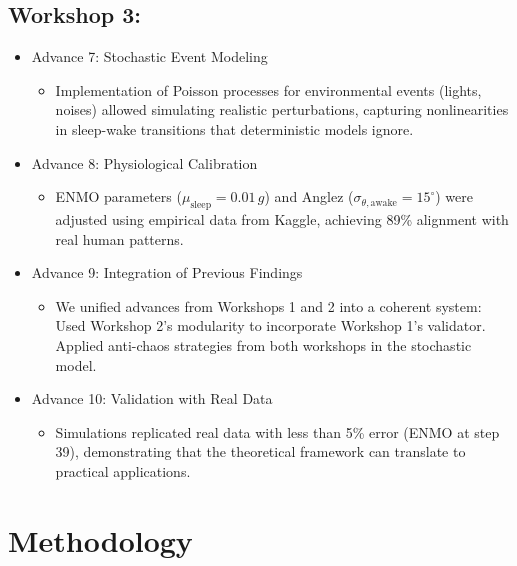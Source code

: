 \documentclass[conference]{IEEEtran}
\begin{document}
\subsection{Workshop 3:}
\begin{itemize}
    \item Advance 7: Stochastic Event Modeling
    \begin{itemize}
    \item Implementation of Poisson processes for environmental events (lights, noises) allowed simulating realistic perturbations, capturing nonlinearities in sleep-wake transitions that deterministic models ignore.
    \end{itemize}
    
    \item Advance 8: Physiological Calibration
    \begin{itemize}
    \item ENMO parameters (\(\mu_{\text{sleep}} = 0.01\,g\)) and Anglez (\(\sigma_{\theta,\text{awake}} = 15^\circ\)) were adjusted using empirical data from Kaggle, achieving 89\% alignment with real human patterns.
    \end{itemize}
    
    \item Advance 9: Integration of Previous Findings
    \begin{itemize}
    \item We unified advances from Workshops 1 and 2 into a coherent system: Used Workshop 2's modularity to incorporate Workshop 1's validator. Applied anti-chaos strategies from both workshops in the stochastic model.
    \end{itemize}
    
    \item Advance 10: Validation with Real Data
    \begin{itemize}
    \item Simulations replicated real data with less than 5\% error (ENMO at step 39), demonstrating that the theoretical framework can translate to practical applications.
    \end{itemize}
\end{itemize}

\section{Methodology}
\end{document}
